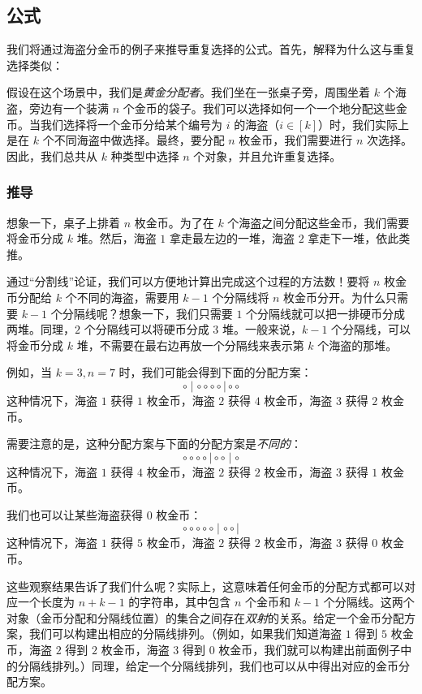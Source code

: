 
\subsection{公式}

我们将通过海盗分金币的例子来推导重复选择的公式。首先，解释为什么这与重复选择类似：

假设在这个场景中，我们是\emph{黄金分配者}。我们坐在一张桌子旁，周围坐着 $k$ 个海盗，旁边有一个装满 $n$ 个金币的袋子。我们可以选择如何一个一个地分配这些金币。当我们选择将一个金币分给某个编号为 $i$ 的海盗（$i \in [k]$）时，我们实际上是在 $k$ 个不同海盗中做选择。最终，要分配 $n$ 枚金币，我们需要进行 $n$ 次选择。因此，我们总共从 $k$ 种类型中选择 $n$ 个对象，并且允许重复选择。

\subsubsection*{推导}

想象一下，桌子上排着 $n$ 枚金币。为了在 $k$ 个海盗之间分配这些金币，我们需要将金币分成 $k$ 堆。然后，海盗 $1$ 拿走最左边的一堆，海盗 $2$ 拿走下一堆，依此类推。

通过``分割线''论证，我们可以方便地计算出完成这个过程的方法数！要将 $n$ 枚金币分配给 $k$ 个不同的海盗，需要用 $k - 1$ 个分隔线将 $n$ 枚金币分开。为什么只需要 $k - 1$ 个分隔线呢？想象一下，我们只需要 $1$ 个分隔线就可以把一排硬币分成两堆。同理，$2$ 个分隔线可以将硬币分成 $3$ 堆。一般来说，$k - 1$ 个分隔线，可以将金币分成 $k$ 堆，不需要在最右边再放一个分隔线来表示第 $k$ 个海盗的那堆。\\

\begin{example}
    例如，当 $k=3, n=7$ 时，我们可能会得到下面的分配方案：
    \[\circ \mid \circ \circ \circ \circ \mid \circ \circ\]
    这种情况下，海盗 $1$ 获得 $1$ 枚金币，海盗 $2$ 获得 $4$ 枚金币，海盗 $3$ 获得 $2$ 枚金币。

    需要注意的是，这种分配方案与下面的分配方案是\emph{不同的}：
    \[\circ \circ \circ \circ \mid \circ \circ \mid \circ\]
    这种情况下，海盗 $1$ 获得 $4$ 枚金币，海盗 $2$ 获得 $2$ 枚金币，海盗 $3$ 获得 $1$ 枚金币。

    我们也可以让某些海盗获得 $0$ 枚金币：
    \[\circ \circ \circ \circ \circ \mid \circ \circ \mid\]
    这种情况下，海盗 $1$ 获得 $5$ 枚金币，海盗 $2$ 获得 $2$ 枚金币，海盗 $3$ 获得 $0$ 枚金币。
\end{example}

这些观察结果告诉了我们什么呢？实际上，这意味着任何金币的分配方式都可以对应一个长度为 $n + k - 1$ 的字符串，其中包含 $n$ 个金币和 $k - 1$ 个分隔线。这两个对象（金币分配和分隔线位置）的集合之间存在\emph{双射}的关系。给定一个金币分配方案，我们可以构建出相应的分隔线排列。（例如，如果我们知道海盗 $1$ 得到 $5$ 枚金币，海盗 $2$ 得到 $2$ 枚金币，海盗 $3$ 得到 $0$ 枚金币，我们就可以构建出前面例子中的分隔线排列。）同理，给定一个分隔线排列，我们也可以从中得出对应的金币分配方案。

